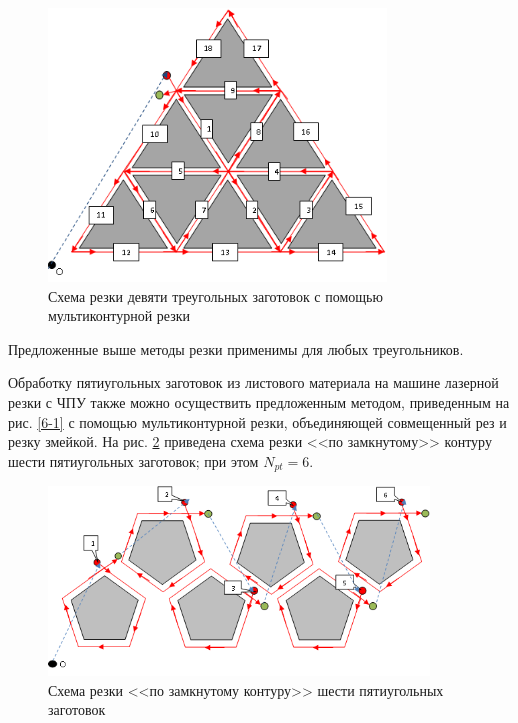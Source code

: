 \documentclass[11pt,twoside]{report}
\begin{document}
\begin{figure}
  \begin{center}
  \includegraphics[width=0.8\textwidth]{3-10.png}
  \caption{Схема резки девяти треугольных заготовок с помощью мультиконтурной резки}
  \label{3-10}
  \end{center}
\end{figure}

Предложенные выше методы резки  применимы для любых треугольников.

Обработку пятиугольных заготовок из листового материала
на машине лазерной резки с ЧПУ также можно осуществить
предложенным методом, приведенным на рис. \ref{6-1}
с помощью мультиконтурной резки,
объединяющей совмещенный рез и резку змейкой.
На рис. \ref{5-6}
приведена схема резки <<по замкнутому>> контуру
шести пятиугольных заготовок;
при этом $N_{pt}=6$.

\begin{figure}
  \begin{center}
  \includegraphics[width=0.9\textwidth]{5-6.png}
  \caption{Схема резки <<по замкнутому контуру>> шести пятиугольных заготовок}
  \label{5-6}
  \end{center}
\end{figure}
\end{document}
